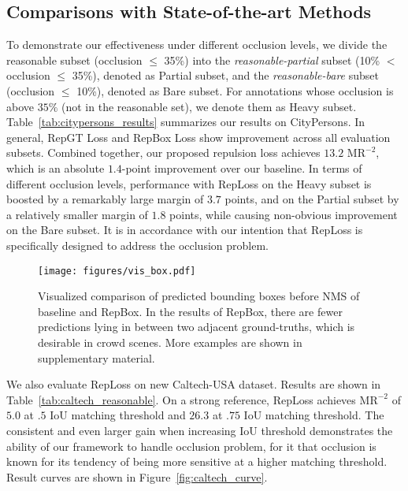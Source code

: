 \documentclass[10pt,twocolumn,letterpaper]{article}
\begin{document}
\subsection{Comparisons with State-of-the-art Methods}
\label{subsec:compareison_with_stateoftheart}
To demonstrate our effectiveness under different occlusion levels, we divide the reasonable subset (occlusion $\leq$ 35\%) into the {\it reasonable-partial} subset (10\% $<$ occlusion $\leq$ 35\%), denoted as Partial subset, and the {\it reasonable-bare} subset (occlusion $\leq$ 10\%), denoted as Bare subset. For annotations whose occlusion is above $35\%$ (not in the reasonable set), we denote them as Heavy subset. Table~\ref{tab:citypersons_results} summarizes our results on CityPersons. In general, RepGT Loss and RepBox Loss show improvement across all evaluation subsets. Combined together, our proposed repulsion loss achieves $13.2$ $\mathrm{MR}^{-2}$, which is an absolute $1.4$-point improvement over our baseline. In terms of different occlusion levels, performance with RepLoss on the Heavy subset is boosted by a remarkably large margin of $3.7$ points, and on the Partial subset by a relatively smaller margin of $1.8$ points, while causing non-obvious improvement on the Bare subset. It is in accordance with our intention that RepLoss is specifically designed to address the occlusion problem.


\begin{figure}[!tbp]
\centering
\texttt{[image: figures/vis\_box.pdf]}
\caption{Visualized comparison of predicted bounding boxes before NMS of baseline and RepBox. In the results of RepBox, there are fewer predictions lying in between two adjacent ground-truths, which is desirable in crowd scenes. More examples are shown in supplementary material.}
\vspace{-0.4cm}
\label{fig:vis_box}
\end{figure}

We also evaluate RepLoss on new Caltech-USA dataset. Results are shown in Table~\ref{tab:caltech_reasonable}. On a strong reference, RepLoss achieves $\mathrm{MR^{-2}}$ of $5.0$ at $.5$ IoU matching threshold and $26.3$ at $.75$ IoU matching threshold. The consistent and even larger gain when increasing IoU threshold demonstrates the ability of our framework to handle occlusion problem, for it that occlusion is known for its tendency of being more sensitive at a higher matching threshold. Result curves are shown in Figure~\ref{fig:caltech_curve}. 

\iffalse
\begin{figure}[t]
\centering
\texttt{[image: figures/caltech\_curve.pdf]}
\caption{Comparisons with state-of-the-art methods on the Caltech test set (reasonable subset) using new annotations.}
\vspace{-0.5cm}
\label{fig:caltech_curve}
\end{figure}
\fi
\end{document}

